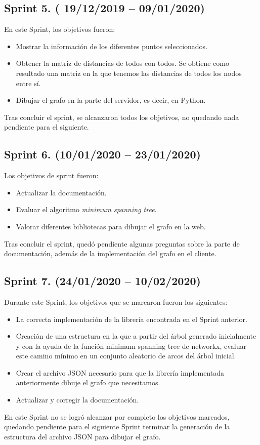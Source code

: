 \subsection{Sprint 5. ( 19/12/2019 -- 09/01/2020)}
En este Sprint, los objetivos fueron:
\begin{itemize}
	\item Mostrar la información de los diferentes puntos seleccionados.
	\item Obtener la matriz de distancias de todos con todos. Se obtiene como resultado una matriz en la que tenemos las distancias de todos los nodos entre sí.
	\item Dibujar el grafo en la parte del servidor, es decir, en Python.
\end{itemize}
Tras concluir el sprint, se alcanzaron todos los objetivos, no quedando nada pendiente para el siguiente.
\subsection{Sprint 6. (10/01/2020 -- 23/01/2020)}
Los objetivos de sprint fueron:
\begin{itemize}
	\item Actualizar la documentación.
	\item Evaluar el algoritmo \textit{minimum spanning tree}.
	\item Valorar diferentes bibliotecas para dibujar el grafo en la web.
\end{itemize}
Tras concluir el sprint, quedó pendiente algunas preguntas sobre la parte de documentación, además de la implementación del grafo en el cliente.
\subsection{Sprint 7. (24/01/2020 -- 10/02/2020)}
Durante este Sprint, los objetivos que se marcaron fueron los siguientes:
\begin{itemize}
	\item La correcta implementación de la librería encontrada en el Sprint anterior.
	\item Creación de una estructura en la que a partir del árbol generado inicialmente y con la ayuda de la función minimum spanning tree de networkx, evaluar este camino mínimo en un conjunto aleatorio de arcos del árbol inicial.
	\item Crear el archivo JSON necesario para que la librería implementada anteriormente dibuje el grafo que necesitamos. 
	\item Actualizar y corregir la documentación.
\end{itemize}
En este Sprint no se logró alcanzar por completo los objetivos marcados, quedando pendiente para el siguiente Sprint terminar la generación de la estructura del archivo JSON para dibujar el grafo.

